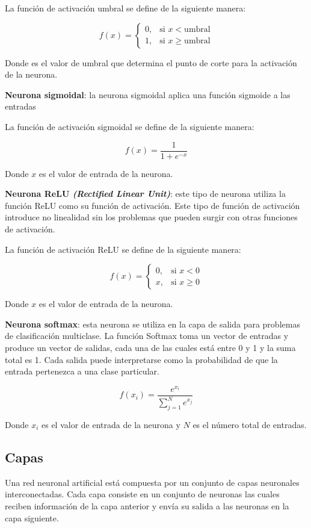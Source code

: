 La función de activación umbral se define de la siguiente manera:

\[
f(x) = \begin{cases}
    0, & \text{si } x < \text{umbral} \\
    1, & \text{si } x \geq \text{umbral}
\end{cases}
\]

Donde  es el valor de umbral que determina el punto de corte para la activación de la neurona.

\textbf{Neurona sigmoidal}: la neurona sigmoidal aplica una función sigmoide a las entradas

La función de activación sigmoidal se define de la siguiente manera:

\[
f(x) = \frac{1}{1 + e^{-x}}
\]

Donde $x$ es el valor de entrada de la neurona.

\textbf{Neurona ReLU \textit{(Rectified Linear Unit)}}: este tipo de neurona utiliza la función ReLU como su función de activación.
Este tipo de función de activación introduce no linealidad sin los problemas que pueden surgir con otras funciones de activación.

La función de activación ReLU se define de la siguiente manera:

\[
f(x) = \begin{cases}
    0, & \text{si } x < 0 \\
    x, & \text{si } x \geq 0
\end{cases}
\]

Donde $x$ es el valor de entrada de la neurona.

\textbf{Neurona softmax}: esta neurona se utiliza en la capa de salida para problemas de clasificación multiclase. La función Softmax toma un vector de entradas y produce un vector de salidas, cada una de las cuales está entre 0 y 1 y la suma total es 1. 
Cada salida puede interpretarse como la probabilidad de que la entrada pertenezca a una clase particular.

\[
f(x_i) = \frac{e^{x_i}}{\sum_{j=1}^{N} e^{x_j}}
\]

Donde $x_i$ es el valor de entrada de la neurona y $N$ es el número total de entradas.

\subsection{Capas}
Una red neuronal artificial está compuesta por un conjunto de capas neuronales interconectadas. 
Cada capa consiste en un conjunto de neuronas las cuales reciben información de la capa anterior y envía su salida a las neuronas en la capa siguiente.

